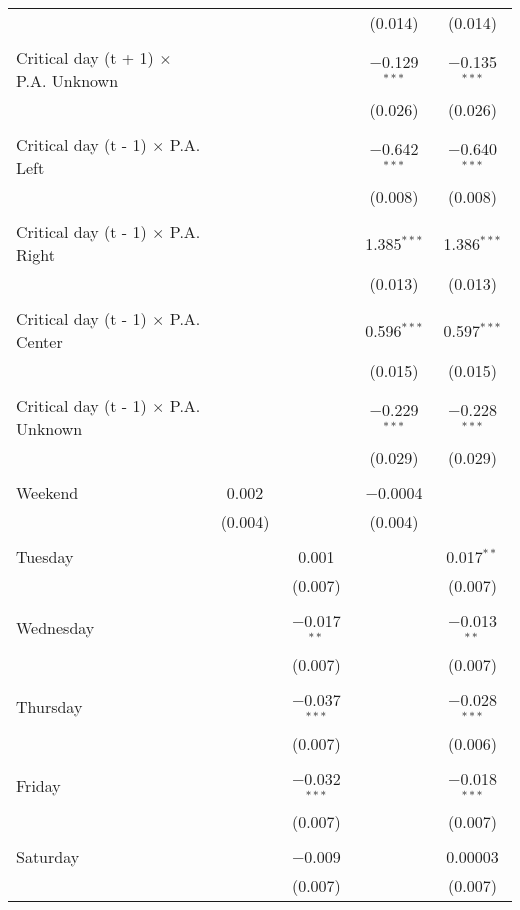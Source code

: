 \documentclass[
]{article}
\begin{document}
\begin{table}[!htbp]
{\begin{tabular}{@{\extracolsep{5pt}}lcccc}
  &  &  & (0.014) & (0.014) \\ 
  & & & & \\ 
 Critical day (t + 1) $\times$ P.A. Unknown &  &  & $-$0.129$^{***}$ & $-$0.135$^{***}$ \\ 
  &  &  & (0.026) & (0.026) \\ 
  & & & & \\ 
 Critical day (t - 1) $\times$ P.A. Left &  &  & $-$0.642$^{***}$ & $-$0.640$^{***}$ \\ 
  &  &  & (0.008) & (0.008) \\ 
  & & & & \\ 
 Critical day (t - 1) $\times$ P.A. Right &  &  & 1.385$^{***}$ & 1.386$^{***}$ \\ 
  &  &  & (0.013) & (0.013) \\ 
  & & & & \\ 
 Critical day (t - 1) $\times$ P.A. Center &  &  & 0.596$^{***}$ & 0.597$^{***}$ \\ 
  &  &  & (0.015) & (0.015) \\ 
  & & & & \\ 
 Critical day (t - 1) $\times$ P.A. Unknown &  &  & $-$0.229$^{***}$ & $-$0.228$^{***}$ \\ 
  &  &  & (0.029) & (0.029) \\ 
  & & & & \\ 
 Weekend & 0.002 &  & $-$0.0004 &  \\ 
  & (0.004) &  & (0.004) &  \\ 
  & & & & \\ 
 Tuesday &  & 0.001 &  & 0.017$^{**}$ \\ 
  &  & (0.007) &  & (0.007) \\ 
  & & & & \\ 
 Wednesday &  & $-$0.017$^{**}$ &  & $-$0.013$^{**}$ \\ 
  &  & (0.007) &  & (0.007) \\ 
  & & & & \\ 
 Thursday &  & $-$0.037$^{***}$ &  & $-$0.028$^{***}$ \\ 
  &  & (0.007) &  & (0.006) \\ 
  & & & & \\ 
 Friday &  & $-$0.032$^{***}$ &  & $-$0.018$^{***}$ \\ 
  &  & (0.007) &  & (0.007) \\ 
  & & & & \\ 
 Saturday &  & $-$0.009 &  & 0.00003 \\ 
  &  & (0.007) &  & (0.007) \\ 

\end{tabular}}
\end{table}
\end{document}
